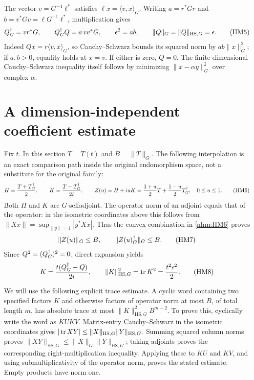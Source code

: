 The vector \(v=G^{-1}\ell^*\) satisfies \(\ell x=\langle v,x\rangle_G\).
Writing \(a=r^*Gr\) and \(b=v^*Gv=\ell G^{-1}\ell^*\), multiplication gives
\begin{equation}
 Q^\dagger_G=vr^*G,\qquad Q^\dagger_G Q=a\,vv^*G,\qquad
 \epsilon^2=ab,\qquad
 \|Q\|_G=\|Q\|_{\mathrm{HS},G}=\epsilon.
 \tag{HM5}\label{nhm:HM5}
\end{equation}
Indeed \(Qx=r\langle v,x\rangle_G\), so Cauchy--Schwarz bounds its squared
norm by \(ab\|x\|_G^2\); if \(a,b>0\), equality holds at \(x=v\).
If either is zero, \(Q=0\). The finite-dimensional Cauchy--Schwarz inequality
itself follows by minimizing \(\|x-\alpha y\|_G^2\) over complex \(\alpha\).

\section{A dimension-independent coefficient estimate}

Fix \(t\). In this section \(T=T(t)\) and \(B=\|T\|_G\).
The following interpolation is an exact comparison path inside the original
endomorphism space, not a substitute for the original family:
\begin{equation}
 H=\frac{T+T^\dagger_G}{2},\qquad K=\frac{T-T^\dagger_G}{2i},\qquad
 Z(u)=H+iuK=\frac{1+u}{2}T+\frac{1-u}{2}T^\dagger_G,
 \quad 0\le u\le1.
 \tag{HM6}\label{nhm:HM6}
\end{equation}
Both \(H\) and \(K\) are \(G\)-selfadjoint. The operator norm of an adjoint
equals that of the operator: in the isometric coordinates above this follows
from \(\|Xx\|=\sup_{\|y\|=1}|y^*Xx|\).
Thus the convex combination in \eqref{nhm:HM6} proves
\begin{equation}
 \|Z(u)\|_G\le B,\qquad \|Z(u)^\dagger_G\|_G\le B.
 \tag{HM7}\label{nhm:HM7}
\end{equation}
Since \(Q^2=(Q^\dagger_G)^2=0\), direct expansion yields
\begin{equation}
 K=\frac{t(Q^\dagger_G-Q)}{2i},\qquad
 \|K\|_{\mathrm{HS},G}^2=\operatorname{tr} K^2=\frac{t^2\epsilon^2}{2}.
 \tag{HM8}\label{nhm:HM8}
\end{equation}

We will use the following explicit trace estimate. A cyclic word containing
two specified factors \(K\) and otherwise factors of operator norm at most
\(B\), of total length \(m\), has absolute trace at most
\(\|K\|_{\mathrm{HS},G}^2 B^{m-2}\).
To prove this, cyclically write the word as \(K U K V\). Matrix-entry
Cauchy--Schwarz in the isometric coordinates gives
\(|\operatorname{tr} XY|\le\|X\|_{\mathrm{HS},G}\|Y\|_{\mathrm{HS},G}\).
Summing squared column norms proves
\(\|XY\|_{\mathrm{HS},G}\le\|X\|_G\|Y\|_{\mathrm{HS},G}\);
taking adjoints proves the corresponding right-multiplication inequality.
Applying these to \(KU\) and \(KV\), and using submultiplicativity of the
operator norm, proves the stated estimate. Empty products have norm one.

